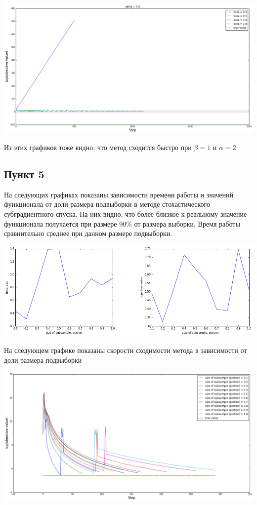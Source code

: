 \documentclass[12pt, a4paper]{article}
\begin{document}
			\begin{center}
				\includegraphics[width=16cm]{4par_30.png}
			\end{center}

			Из этих графиков тоже видно, что метод сходится быстро при $\beta = 1$ и $\alpha = 2$ 

		\newpage
		\subsection{Пункт 5}
			На следующих графиках показаны зависимости времени работы и значений функционала от доли размера подвыборки в методе стохастического субградиентного спуска.
			На них видно, что более близкое к реальному значение функционала получается при размере 90\% от размера выборки. Время работы сравнительно среднее при данном размере подвыборки.

			\begin{center}
				\includegraphics[width=18cm]{5par.png}
			\end{center}

			На следующем графике показаны скорости сходимости метода в зависимости от доли размера подвыборки

			\begin{center}
				\includegraphics[width=18cm]{5par_one.png}
			\end{center}
\end{document}
